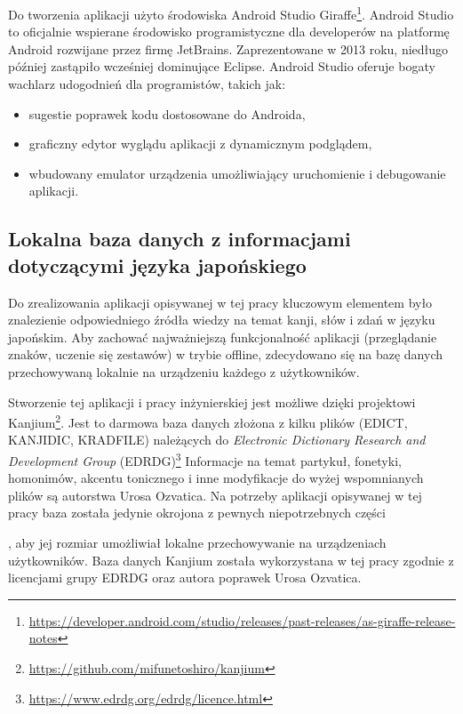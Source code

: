 \documentclass[a4paper,twoside,12pt]{book}
\newcommand{\ksremark}[1]{%
{%
{\color{brickred}{[#1]}}}%
\addcontentsline{rks}{uwagas}{\protect{#1}}%
}
\newcommand{\obcy}[1]{\emph{#1}}
\newcommand{\english}[1]{{\selectlanguage{british}\obcy{#1}}}
\begin{document}
Do tworzenia aplikacji użyto środowiska Android Studio Giraffe\footnote{\url{https://developer.android.com/studio/releases/past-releases/as-giraffe-release-notes}}. Android Studio to oficjalnie wspierane środowisko programistyczne dla developerów na platformę Android rozwijane przez firmę JetBrains. Zaprezentowane w 2013 roku, niedługo później zastąpiło wcześniej dominujące Eclipse. Android Studio oferuje bogaty wachlarz udogodnień dla programistów, takich jak:
\begin{itemize}
\item sugestie poprawek kodu dostosowane do Androida,
\item graficzny edytor wyglądu aplikacji z dynamicznym podglądem,
\item wbudowany emulator urządzenia umożliwiający uruchomienie i debugowanie aplikacji.
\end{itemize}
 
\subsection{Lokalna baza danych z informacjami dotyczącymi języka japońskiego}

Do zrealizowania aplikacji opisywanej w tej pracy kluczowym elementem było znalezienie odpowiedniego źródła wiedzy na temat kanji, słów i zdań w języku japońskim. Aby zachować najważniejszą funkcjonalność aplikacji (przeglądanie znaków, uczenie się zestawów) w trybie offline, zdecydowano się na bazę danych przechowywaną lokalnie na urządzeniu każdego z użytkowników. 

Stworzenie tej aplikacji i pracy inżynierskiej jest możliwe dzięki projektowi Kanjium\footnote{\url{https://github.com/mifunetoshiro/kanjium}}. Jest to darmowa baza danych złożona z kilku plików (EDICT, KANJIDIC, KRADFILE) należących do  \english{Electronic Dictionary Research and Development Group} (EDRDG)\footnote{\url{https://www.edrdg.org/edrdg/licence.html}} Informacje na temat partykuł, fonetyki, homonimów, akcentu tonicznego i inne modyfikacje do wyżej wspomnianych plików są autorstwa Urosa Ozvatica. Na potrzeby aplikacji opisywanej w tej pracy baza została jedynie okrojona z pewnych niepotrzebnych części 
\ksremark{np. czego? todo}
, aby jej rozmiar umożliwiał lokalne przechowywanie na urządzeniach użytkowników. Baza danych Kanjium została wykorzystana w tej pracy zgodnie z licencjami grupy EDRDG oraz autora poprawek Urosa Ozvatica.
\end{document}
